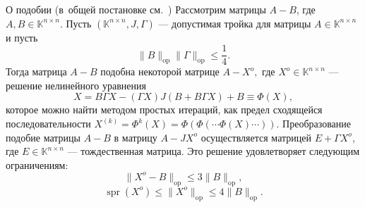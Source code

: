 \begin{ksvthm*}{О подобии (в~общей постановке см.~\cite{baskakov-harmonic,baskakov1983})}
    Рассмотрим матрицы \( A-B \),
        где \( A,B\in \mathbb{K}^{n{\times}n} \).
    Пусть \( (\mathbb{K}^{n\times n}, J, \Gamma) \)
        --- допустимая тройка для матрицы \( A\in\mathbb{K}^{n{\times}n} \)
        и пусть
    \[
        \|B\|_{\mathrm{op}} \|\Gamma\|_{\mathrm{op}} \leq \frac14.
        \]
    Тогда матрица \( A-B \)
        подобна некоторой матрице \( A-X^o, \)
        где \( X^o\in\mathbb{K}^{n{\times}n} \)
        --- решение нелинейного уравнения
    \[
        X = B\Gamma X - (\Gamma X)J(B + B\Gamma X) + B \equiv \Phi(X),
        \]
        которое можно найти методом простых итераций,
        как предел сходящейся последовательности
        \( X^{(k)} = \Phi^{k}(X) = \Phi(\Phi(\cdots\Phi(X)\cdots)) \).
    Преобразование подобие матрицы \( A-B \)
        в матрицу \( A-JX^o \) осуществляется
        матрицей \( E+\Gamma X^o \),
        где \( E\in\mathbb{K}^{n{\times}n} \) --- тождественная матрица.
    Это решение удовлетворяет следующим ограничениям:
    \[ \|X^o - B\|_{\mathrm{op}} \leq 3\|B\|_{\mathrm{op}}, \]
    \[ \operatorname{spr}(X^o) \leq \|X^o\|_{\mathrm{op}} \leq 4\|B\|_{\mathrm{op}}. \]
\end{ksvthm*}
